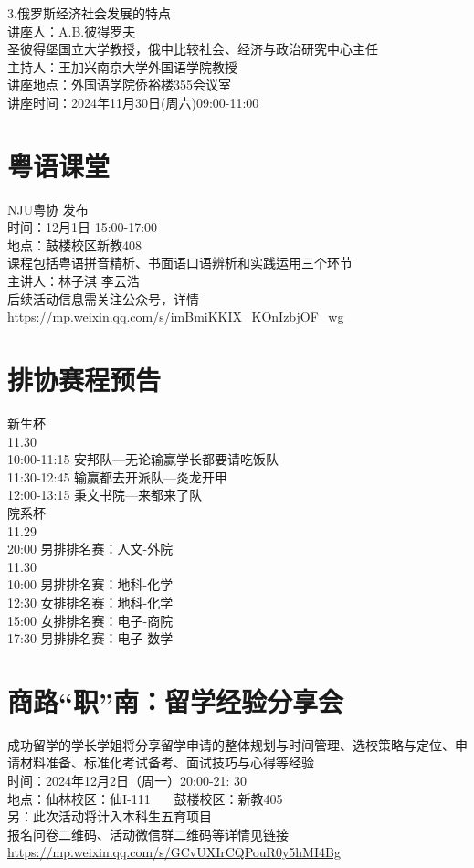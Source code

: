 \documentclass[letterpaper, 12pt]{article}
\begin{document}
\begin{multicols}{2}
3.俄罗斯经济社会发展的特点\\
讲座人：A.B.彼得罗夫\\
圣彼得堡国立大学教授，俄中比较社会、经济与政治研究中心主任\\
主持人：王加兴南京大学外国语学院教授\\
讲座地点：外国语学院侨裕楼355会议室\\
讲座时间：2024年11月30日(周六)09:00-11:00

\section{粤语课堂}
NJU粤协 发布\\
时间：12月1日 15:00-17:00\\
地点：鼓楼校区新教408\\
课程包括粤语拼音精析、书面语口语辨析和实践运用三个环节\\
主讲人：林子淇  李云浩\\
后续活动信息需关注公众号，详情\url{https://mp.weixin.qq.com/s/imBmiKKIX_KOnIzbjOF_wg}\\

\section{排协赛程预告}
新生杯\\
11.30\\
10:00-11:15  安邦队—无论输赢学长都要请吃饭队\\
11:30-12:45  输赢都去开派队—炎龙开甲\\
12:00-13:15	 秉文书院—来都来了队\\
院系杯  \\
11.29\\
20:00  男排排名赛：人文-外院\\
11.30\\
10:00  男排排名赛：地科-化学\\
12:30  女排排名赛：地科-化学\\
15:00  女排排名赛：电子-商院\\
17:30  男排排名赛：电子-数学\\


\section{商路“职”南：留学经验分享会}
成功留学的学长学姐将分享留学申请的整体规划与时间管理、选校策略与定位、申请材料准备、标准化考试备考、面试技巧与心得等经验\\时间：2024年12月2日（周一）20:00-21: 30\\
地点：仙林校区：仙I-111    鼓楼校区：新教405\\另：此次活动将计入本科生五育项目\\报名问卷二维码、活动微信群二维码等详情见链接\url{https://mp.weixin.qq.com/s/GCvUXIrCQPouR0y5hMI4Bg}\\

\end{multicols}
\end{document}
